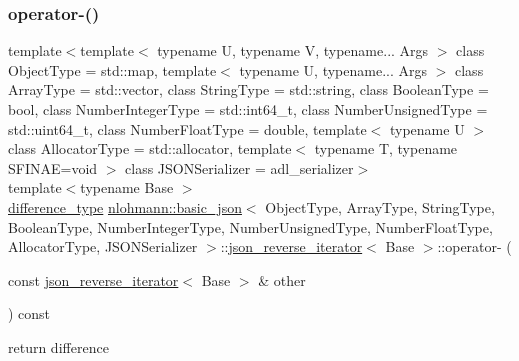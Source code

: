 \subsubsection{\texorpdfstring{operator-\/()}{operator-()}\hspace{0.1cm}{\footnotesize\ttfamily [2/2]}}
{\footnotesize\ttfamily template$<$template$<$ typename U, typename V, typename... Args $>$ class Object\+Type = std\+::map, template$<$ typename U, typename... Args $>$ class Array\+Type = std\+::vector, class String\+Type  = std\+::string, class Boolean\+Type  = bool, class Number\+Integer\+Type  = std\+::int64\+\_\+t, class Number\+Unsigned\+Type  = std\+::uint64\+\_\+t, class Number\+Float\+Type  = double, template$<$ typename U $>$ class Allocator\+Type = std\+::allocator, template$<$ typename T, typename S\+F\+I\+N\+A\+E=void $>$ class J\+S\+O\+N\+Serializer = adl\+\_\+serializer$>$ \\
template$<$typename Base $>$ \\
\mbox{\hyperlink{classnlohmann_1_1basic__json_afe7c1303357e19cea9527af4e9a31d8f}{difference\+\_\+type}} \mbox{\hyperlink{classnlohmann_1_1basic__json}{nlohmann\+::basic\+\_\+json}}$<$ Object\+Type, Array\+Type, String\+Type, Boolean\+Type, Number\+Integer\+Type, Number\+Unsigned\+Type, Number\+Float\+Type, Allocator\+Type, J\+S\+O\+N\+Serializer $>$\+::\mbox{\hyperlink{classnlohmann_1_1basic__json_1_1json__reverse__iterator}{json\+\_\+reverse\+\_\+iterator}}$<$ Base $>$\+::operator-\/ (\begin{DoxyParamCaption}\item[{const \mbox{\hyperlink{classnlohmann_1_1basic__json_1_1json__reverse__iterator}{json\+\_\+reverse\+\_\+iterator}}$<$ Base $>$ \&}]{other }\end{DoxyParamCaption}) const\hspace{0.3cm}{\ttfamily [inline]}}



return difference 

\mbox{\label{classnlohmann_1_1basic__json_1_1json__reverse__iterator_abc37aca3fee5d832f254c94e1cd2f216}} 
